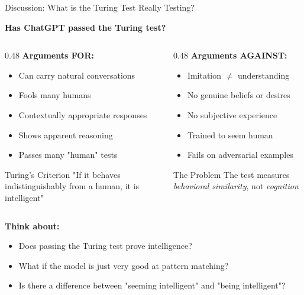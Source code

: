 \documentclass[aspectratio=169]{beamer}
\begin{document}
\begin{frame}{Discussion: What is the Turing Test Really Testing? 💭}
\begin{center}
\Large
\textbf{Has ChatGPT passed the Turing test?}
\end{center}

\vspace{1em}

\begin{columns}[T]
\begin{column}{0.48\textwidth}
\textbf{Arguments FOR:}
\begin{itemize}
    \item Can carry natural conversations
    \item Fools many humans
    \item Contextually appropriate responses
    \item Shows apparent reasoning
    \item Passes many "human" tests
\end{itemize}

\vspace{0.5em}

\begin{exampleblock}{Turing's Criterion}
"If it behaves indistinguishably from a human, it is intelligent"
\end{exampleblock}
\end{column}

\begin{column}{0.48\textwidth}
\textbf{Arguments AGAINST:}
\begin{itemize}
    \item Imitation $\neq$ understanding
    \item No genuine beliefs or desires
    \item No subjective experience
    \item Trained to seem human
    \item Fails on adversarial examples
\end{itemize}

\vspace{0.5em}

\begin{alertblock}{The Problem}
The test measures \textit{behavioral similarity}, not \textit{cognition}
\end{alertblock}
\end{column}
\end{columns}

\vspace{1em}

\textbf{Think about:}
\begin{itemize}
    \item Does passing the Turing test prove intelligence?
    \item What if the model is just very good at pattern matching?
    \item Is there a difference between "seeming intelligent" and "being intelligent"?
\end{itemize}
\end{frame}
\end{document}
